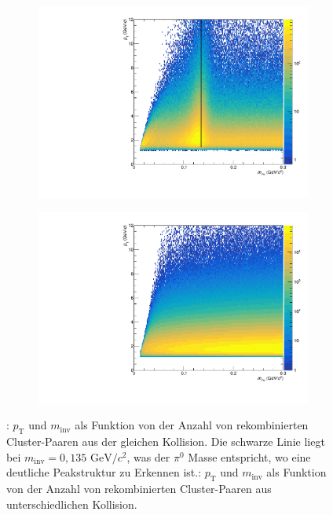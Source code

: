 \begin{figure}[tbp] \label{figInvMassPt}
	\centering
	\begin{subfigure}{.5\textwidth}
		\centering
		\includegraphics[width=.95\linewidth]{hInvMass_pT_Signal.pdf}
		\caption{}
		\label{figInvMassPt_a}
	\end{subfigure}%
	\begin{subfigure}{.5\textwidth}
		\centering
		\includegraphics[width=.95\linewidth]{hInvMass_pT_Bkg.pdf}
		\caption{}
		\label{figInvMassPt_b}
	\end{subfigure}
	\caption{: $p_\text{T}$ und $m_\text{inv}$ als Funktion von der Anzahl von rekombinierten  Cluster-Paaren aus der gleichen Kollision. Die schwarze Linie liegt bei $m_{\text{inv}}=0,135\text{ GeV/}c^{2}$, was der $\pi^{0}$ Masse entspricht, wo eine deutliche Peakstruktur zu Erkennen ist.: $p_\text{T}$ und $m_\text{inv}$ als Funktion von der Anzahl von rekombinierten  Cluster-Paaren aus unterschiedlichen Kollision.}
\end{figure}
